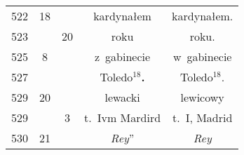 \documentclass[a4paper,11pt]{article}
\begin{document}
\begin{center}
\begin{tabular}{|c|c|c|c|c|}
    522 & 18 & & kardynałem & kardynałem. \\
    523 & & 20 & roku & roku. \\
    525 & \hphantom{0}8 & & z~gabinecie & w~gabinecie \\
    527 & & & Toledo$^{ 18 }$\textbf{.} & Toledo$^{ 18 }$. \\
    529 & 20 & & lewacki & lewicowy \\
    529 & & \hphantom{0}3 & t.~Ivm Mardird & t.~I, Madrid \\
    530 & 21 & & \textit{Rey}” & \textit{Rey} \\
    \hline
  \end{tabular}





  \newpage


\end{center}
\end{document}

